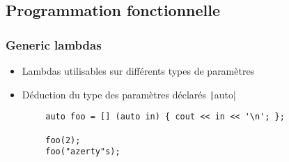 \documentclass[C++.tex]{subfiles}
\begin{document}
\subsection*{Programmation fonctionnelle}
\begin{frame}[fragile]
	\frametitle{Generic lambdas}
	\begin{itemize}
		\item Lambdas utilisables sur différents types de paramètres
		\item Déduction du type des paramètres déclarés \texttt|auto|
	\end{itemize}

	\begin{verbatim}
		auto foo = [] (auto in) { cout << in << '\n'; };

		foo(2);
		foo("azerty"s);
	\end{verbatim}


\end{frame}
\end{document}
